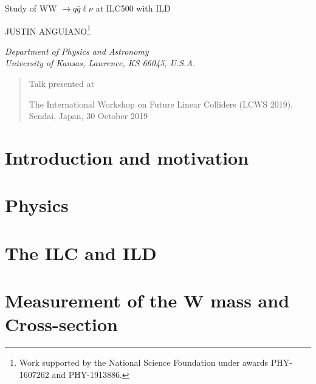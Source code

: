 \documentclass[12pt]{article}
\newcommand\pubnumber{}
\newcommand\pubdate{\today}
\def\kansas{Department of Physics and Astronomy\\
University of Kansas, Lawrence, KS 66045, U.S.A.}
\def\support{\footnote{Work supported by the National Science Foundation  
                       under awards PHY-1607262 and PHY-1913886.}}
\def\Title#1{\begin{center} {\Large #1 } \end{center}}
\def\Author#1{\begin{center}{ \sc #1} \end{center}}
\def\Address#1{\begin{center}{ \it #1} \end{center}}
\newcommand\pubblock{\rightline{\begin{tabular}{l} \pubnumber\\
         \pubdate  \end{tabular}}}
\newenvironment{Abstract}{\begin{quotation}  }{\end{quotation}}
\newenvironment{Presented}{\begin{quotation} \begin{center} 
             Talk presented at \end{center}\bigskip 
      \begin{center}\begin{large}}{\end{large}\end{center} \end{quotation}}
\begin{document}
\begin{titlepage}
\pubblock

\vfill
\Title{Study of WW $\rightarrow q\bar{q}\ell\nu$ at ILC500 with ILD }
\vfill
\Author{JUSTIN ANGUIANO\support}
\Address{\kansas}
\vfill
\begin{Abstract}

\end{Abstract}
\vfill
\begin{Presented}
The International Workshop on Future Linear Colliders (LCWS 2019),\\
Sendai, Japan, 30 October 2019\\
\end{Presented}
\vfill
\end{titlepage}
\def\thefootnote{\fnsymbol{footnote}}
\setcounter{footnote}{0}
%



\section{Introduction and motivation}
\label{sec:Introduction}

\section{Physics}
\label{sec:physics}






\section{The ILC and ILD}
\label{sec:ILC_detector}



\section{Measurement of the W mass and Cross-section}
\label{Current_Work} 
\end{document}
